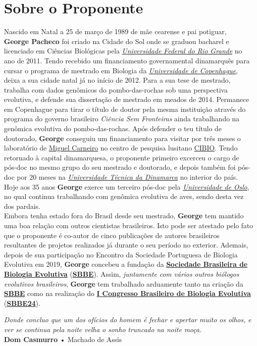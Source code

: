 \thispagestyle{plain} %
\chapter*{Sobre o Proponente}

\hspace*{2em}Nascido em Natal a 25 de março de 1989 de mãe cearense e pai potiguar, \textbf{George Pacheco} foi criado na Cidade do Sol onde se graduou bacharel e licenciado em Ciências Biológicas pela \textit{\href{https://www.ufrn.br/}{Universidade Federal do Rio Grande}} no ano de 2011. Tendo recebido um financiamento governamental dinamarquês para cursar o programa de mestrado em Biologia da \textit{\href{https://www.ku.dk/english/}{Universidade de Copenhague}}, deixa a sua cidade natal já no início de 2012. Para a sua tese de mestrado, trabalha com dados genômicos do pombo-das-rochas sob uma perspectiva evolutiva, e defende sua dissertação de mestrado em meados de 2014. Permanece em Copenhague para tirar o título de doutor pela mesma instituição através do programa do governo brasileiro \textit{Ciência Sem Fronteiras} ainda trabalhando na genômica evolutiva do pombo-das-rochas. Após defender o teu título de doutorado, \textbf{George} conseguiu um financiamento para visitar por três meses o laboratório de \href{https://www.cibio.up.pt/en/people/details/miguel-jorge-pinto-carneiro/}{Miguel Carneiro} no centro de pesquisa lusitano \href{https://www.cibio.up.pt/en/}{CIBIO}. Tendo retornado à capital dinamarquesa, o proponente primeiro excerceu o cargo de pós-doc no mesmo grupo do seu mestrado e doutorado, e depois também foi pós-doc por 20 meses na \textit{\href{https://www.dtu.dk/english/}{Universidade Técnica da Dinamarca}} no interior do país. Hoje aos 35 anos \textbf{George} exerce um terceiro pós-doc pela \textit{\href{https://www.uio.no/english/}{Universidade de Oslo}}, no qual continua trabalhando com genômica evolutiva de aves, sendo desta vez dos pardais. \\
\hspace*{2em}Embora tenha estado fora do Brasil desde seu mestrado, \textbf{George} tem mantido uma boa relação com outros cientistas brasileiros. Isto pode ser atestado pelo fato que o proponente é co-autor de cinco publicações de autores brasileiros resultantes de projetos realizados já durante o seu período no exterior. Ademais, depois de sua participação no Encontro da Sociedade Portuguesa de Biologia Evolutiva em 2019, \textbf{George} concebeu a fundação da \textbf{\href{https://sbbevol.org/estatuto/}{Sociedade Brasileira de Biologia Evolutiva}} (\textbf{\href{https://sbbevol.org/estatuto/}{SBBE}}). Assim, \textit{juntamente com vários outros biólogos evolutivos brasileiros}, \textbf{George} tem trabalhado arduamente tanto na criação da \textbf{\href{https://sbbevol.org/estatuto/}{SBBE}} como na realização do \textbf{\href{https://sbbevol.org/}{I Congresso Brasileiro de Biologia Evolutiva}} (\textbf{\href{https://sbbevol.org/}{SBBE24}}).

\vfill

\begin{importantbox}
\raggedleft
{\large\textit{Donde concluo que um dos ofícios do homem é fechar e apertar muito os olhos, e ver se continua pela noite velha o sonho truncado na noite moça.}} \\
\textbf{Dom Casmurro} • Machado de Assis
\end{importantbox}